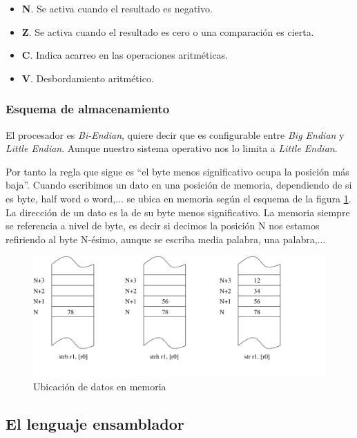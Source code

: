 \begin{descript}
    \begin{itemize}
      \item{\textbf{N}. Se activa cuando el resultado es negativo.}
      \item{\textbf{Z}. Se activa cuando el resultado es cero o una comparación es cierta.}
      \item{\textbf{C}. Indica acarreo en las operaciones aritméticas.}
      \item{\textbf{V}. Desbordamiento aritmético.}
    \end{itemize}
\end{descript}


\subsubsection{Esquema de almacenamiento}

El procesador es {\it Bi-Endian}, quiere decir que es configurable entre {\it Big Endian}
y {\it Little Endian}. Aunque nuestro sistema operativo nos lo limita a {\it Little Endian}.

Por tanto la regla que sigue es ``el byte menos significativo ocupa la posición más baja''.
Cuando escribimos un dato en una posición de memoria, dependiendo de si es byte, half word
o word,... se ubica en memoria según el esquema de la figura \ref{fig:memo}. La dirección de un dato
es la de su byte menos significativo. La memoria siempre se referencia a nivel de byte, es
decir si decimos la posición N nos estamos refiriendo al byte N-ésimo, aunque se escriba
media palabra, una palabra,...

\begin{figure}[h]
  \centering
    \includegraphics[width=13cm]{graphs/memo.pdf}
  \caption{Ubicación de datos en memoria}
  \label{fig:memo}
\end{figure}

\subsection{El lenguaje ensamblador}

